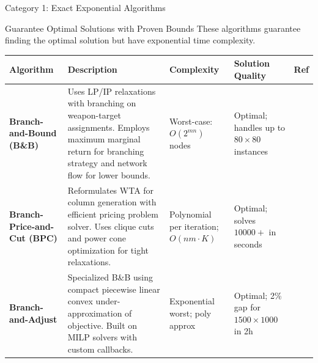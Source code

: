 \documentclass[aspectratio=43,8pt]{beamer}
\begin{document}
\begin{frame}{Category 1: Exact Exponential Algorithms}
\begin{block}{Guarantee Optimal Solutions with Proven Bounds}
These algorithms guarantee finding the optimal solution but have exponential time complexity.
\end{block}

\vspace{0.2cm}
\begin{table}[h]
\centering
\small
\begin{tabular}{p{1.8cm}p{3.8cm}p{1.6cm}p{1.7cm}p{0.6cm}}
\toprule
\textbf{Algorithm} & \textbf{Description} & \textbf{Complexity} & \textbf{Solution Quality} & \textbf{Ref} \\
\midrule
\textbf{Branch-and-Bound (B\&B)} & Uses LP/IP relaxations with branching on weapon-target assignments. Employs maximum marginal return for branching strategy and network flow for lower bounds. & Worst-case: $O(2^{mn})$ nodes & \textcolor{accentgreen}{Optimal}; handles up to $80 \times 80$ instances & \cite{ahuja2007} \\
\addlinespace
\textbf{Branch-Price-and-Cut (BPC)} & Reformulates WTA for column generation with efficient pricing problem solver. Uses clique cuts and power cone optimization for tight relaxations. & Polynomial per iteration; $O(nm \cdot K)$ & \textcolor{accentgreen}{Optimal}; solves $10000+$ in seconds & \cite{bertsimas2025} \\
\addlinespace
\textbf{Branch-and-Adjust} & Specialized B\&B using compact piecewise linear convex under-approximation of objective. Built on MILP solvers with custom callbacks. & Exponential worst; poly approx & \textcolor{accentgreen}{Optimal}; 2\% gap for $1500 \times 1000$ in 2h & \cite{andersen2022} \\
\bottomrule
\end{tabular}
\end{table}

\end{frame}
\end{document}
